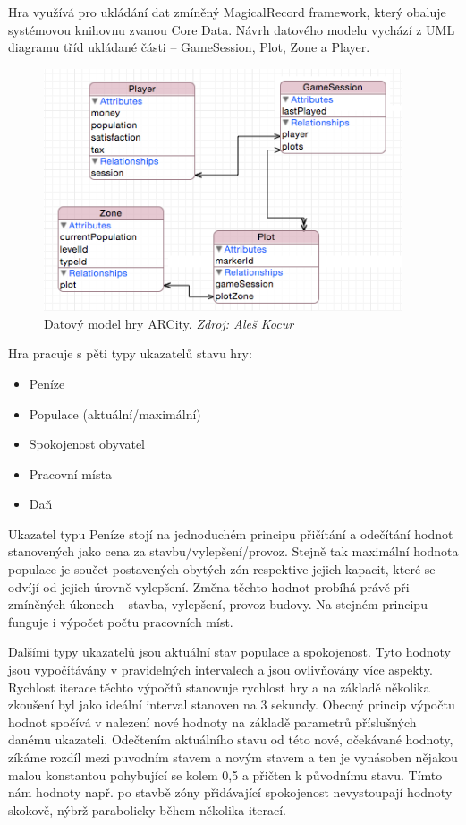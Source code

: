 \documentclass[twoside,12pt]{article}
\begin{document}
 Hra využívá pro ukládání dat zmíněný MagicalRecord framework, který obaluje systémovou knihovnu zvanou Core Data. Návrh datového modelu vychází z UML diagramu tříd ukládané části -- GameSession, Plot, Zone a Player.
 
 \begin{figure}[H]
\centering
    \includegraphics[width=400px, center]{images/core-data-model.png}
\captionsetup{justification=centering}
    \caption{Datový model hry ARCity. \textit{Zdroj: Aleš Kocur}}
    \label{class_diagram}
\end{figure}

 
 Hra pracuje s pěti typy ukazatelů stavu hry:
  
 \begin{itemize}
\item Peníze
\item Populace (aktuální/maximální)
\item Spokojenost obyvatel
\item Pracovní místa
\item Daň
\end{itemize}
 
 Ukazatel typu Peníze stojí na jednoduchém principu přičítání a odečítání hodnot stanovených jako cena za stavbu/vylepšení/provoz. Stejně tak maximální hodnota populace je součet postavených obytých zón respektive jejich kapacit, které se odvíjí od jejich úrovně vylepšení. Změna těchto hodnot probíhá právě při zmíněných úkonech -- stavba, vylepšení, provoz budovy. Na stejném principu funguje i výpočet počtu pracovních míst.
 
 Dalšími typy ukazatelů jsou aktuální stav populace a spokojenost. Tyto hodnoty jsou vypočítávány v pravidelných intervalech a jsou ovlivňovány více aspekty. Rychlost iterace těchto výpočtů stanovuje rychlost hry a na základě několika zkoušení byl jako ideální interval stanoven na 3 sekundy. Obecný princip výpočtu hodnot spočívá v nalezení nové hodnoty na základě parametrů příslušných danému ukazateli. Odečtením aktuálního stavu od této nové, očekávané hodnoty, zíkáme rozdíl mezi puvodním stavem a novým stavem a ten je vynásoben nějakou malou konstantou pohybující se kolem 0,5 a přičten k původnímu stavu. Tímto nám hodnoty např. po stavbě zóny přidávající spokojenost nevystoupají hodnoty skokově, nýbrž parabolicky během několika iterací.
 
\end{document}
